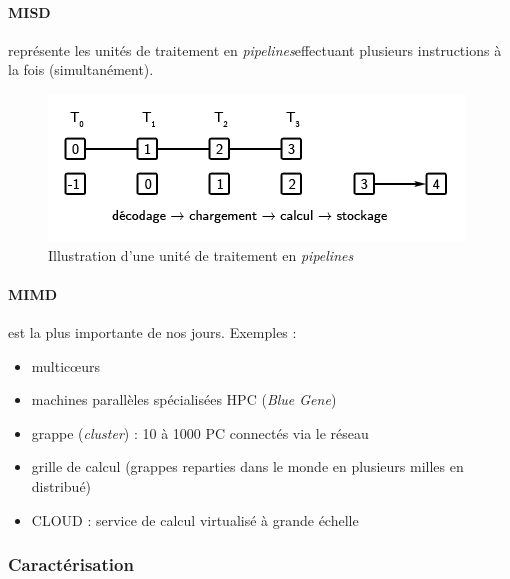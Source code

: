 \documentclass[12pt, a4paper]{article}
\begin{document}
        \paragraph{MISD} représente les unités de traitement en
        \textit{pipelines}effectuant plusieurs instructions à la fois
        (simultanément).
          \begin{figure}[!ht]
        		\centering
        		\includegraphics{images/misd.png}
        		\caption{Illustration d'une unité de traitement en
            \textit{pipelines}}
        		\label{fig:misd}
      	  \end{figure}
        \paragraph{MIMD} est la plus importante de nos jours. Exemples :
          \begin{itemize}
            \item multic\oe urs
            \item machines parallèles spécialisées HPC (\textit{Blue Gene})
            \item grappe (\textit{cluster}) : 10 à 1000 PC connectés via le
            réseau
            \item grille de calcul (grappes reparties dans le monde en plusieurs
            milles en distribué)
            \item CLOUD : service de calcul virtualisé à grande échelle
          \end{itemize}
      \subsubsection{Caractérisation}
\end{document}
